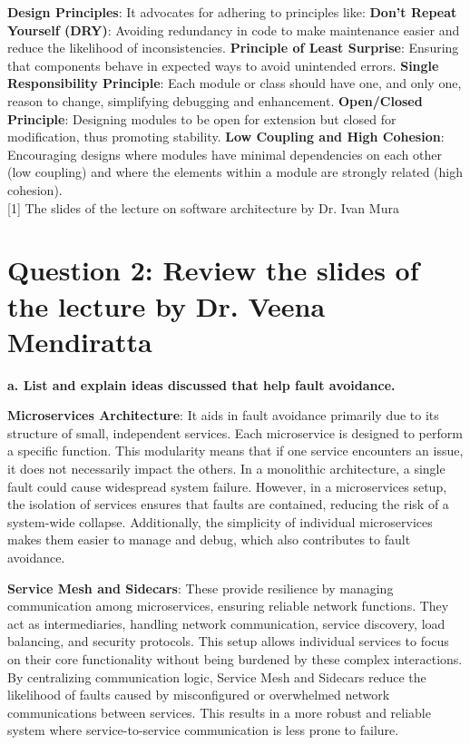 \documentclass[12pt]{article}
\numberwithin{table}{section}
\begin{document}
	\textbf{Design Principles}: It advocates for adhering to principles like:
	\textbf{Don't Repeat Yourself (DRY)}: Avoiding redundancy in code to make maintenance easier and reduce the likelihood of inconsistencies.
	\textbf{Principle of Least Surprise}: Ensuring that components behave in expected ways to avoid unintended errors.
	\textbf{Single Responsibility Principle}: Each module or class should have one, and only one, reason to change, simplifying debugging and enhancement.
	\textbf{Open/Closed Principle}: Designing modules to be open for extension but closed for modification, thus promoting stability.
	\textbf{Low Coupling and High Cohesion}: Encouraging designs where modules have minimal dependencies on each other (low coupling) and where the elements within a module are strongly related (high cohesion).\\
	
	{\small [1] The slides of the lecture on software architecture by Dr. Ivan Mura}
	\section*{Question 2: Review the slides of the lecture by Dr. Veena Mendiratta} 
	\textbf{a. List and explain ideas discussed that help fault avoidance. }
	
	\textbf{Microservices Architecture}: It aids in fault avoidance primarily due to its structure of small, independent services. Each microservice is designed to perform a specific function. This modularity means that if one service encounters an issue, it does not necessarily impact the others. In a monolithic architecture, a single fault could cause widespread system failure. However, in a microservices setup, the isolation of services ensures that faults are contained, reducing the risk of a system-wide collapse. Additionally, the simplicity of individual microservices makes them easier to manage and debug, which also contributes to fault avoidance.
	
	\textbf{Service Mesh and Sidecars}: These provide resilience by managing communication among microservices, ensuring reliable network functions. They act as intermediaries, handling network communication, service discovery, load balancing, and security protocols. This setup allows individual services to focus on their core functionality without being burdened by these complex interactions. By centralizing communication logic, Service Mesh and Sidecars reduce the likelihood of faults caused by misconfigured or overwhelmed network communications between services. This results in a more robust and reliable system where service-to-service communication is less prone to failure.
	
\end{document}
